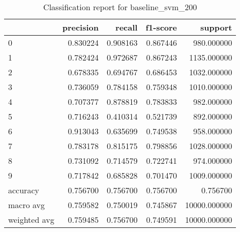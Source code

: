 \begin{table}[htb!]
\centering
\begin{tabular}{lrrrr}
    \toprule
 & precision & recall & f1-score & support \\
 \midrule
 0 & 0.830224 & 0.908163 & 0.867446 & 980.000000 \\
 1 & 0.782424 & 0.972687 & 0.867243 & 1135.000000 \\
 2 & 0.678335 & 0.694767 & 0.686453 & 1032.000000 \\
 3 & 0.736059 & 0.784158 & 0.759348 & 1010.000000 \\
 4 & 0.707377 & 0.878819 & 0.783833 & 982.000000 \\
 5 & 0.716243 & 0.410314 & 0.521739 & 892.000000 \\
 6 & 0.913043 & 0.635699 & 0.749538 & 958.000000 \\
 7 & 0.783178 & 0.815175 & 0.798856 & 1028.000000 \\
 8 & 0.731092 & 0.714579 & 0.722741 & 974.000000 \\
 9 & 0.717842 & 0.685828 & 0.701470 & 1009.000000 \\
 accuracy & 0.756700 & 0.756700 & 0.756700 & 0.756700 \\
 macro avg & 0.759582 & 0.750019 & 0.745867 & 10000.000000 \\
 weighted avg & 0.759485 & 0.756700 & 0.749591 & 10000.000000 \\
 \bottomrule
\end{tabular}
\caption{Classification report for baseline\_svm\_200}
\label{tab:classification-report-baseline_svm_200}
\end{table}
